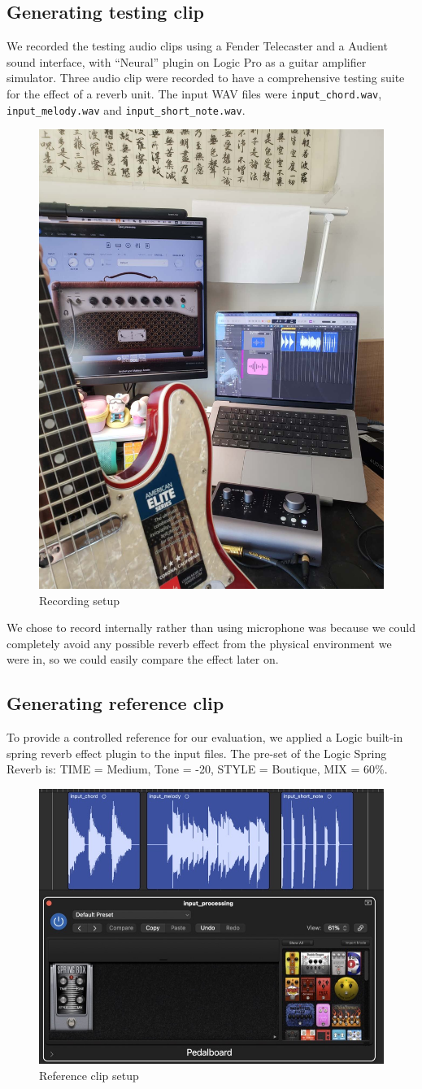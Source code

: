 \documentclass[12pt]{article}
\begin{document}
\subsection{Generating testing clip}

We recorded the testing audio clips using a Fender Telecaster and a Audient sound interface, with ``Neural'' plugin on Logic Pro as a guitar amplifier simulator. Three audio clip were recorded to have a comprehensive testing suite for the effect of a reverb unit. The input WAV files were \texttt{input\_chord.wav}, \texttt{input\_melody.wav} and \texttt{input\_short\_note.wav}.

 \begin{figure}[h] 
	\center 
	\includegraphics[width=0.2\linewidth]{photos/clip_record_setup.jpg} 
	\caption{Recording setup} 
\end{figure} 

We chose to record internally rather than using microphone was because we could completely avoid any possible reverb effect from the physical environment we were in, so we could easily compare the effect later on.

\subsection{Generating reference clip}

To provide a controlled reference for our evaluation, we applied a Logic built-in spring reverb effect plugin to the input files. The pre-set of the Logic Spring Reverb is: TIME = Medium, Tone = -20, STYLE = Boutique, MIX = 60\%. 

 \begin{figure}[h] 
	\center 
	\includegraphics[width=0.4\linewidth]{photos/reverb.jpg} 
	\caption{Reference clip setup} 
\end{figure} 
\end{document}
